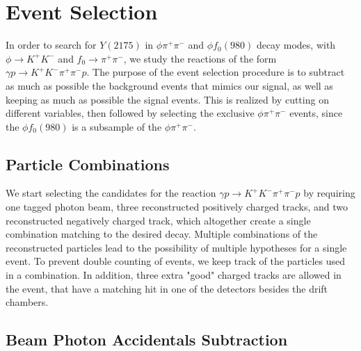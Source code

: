 \section{Event Selection}
\label{sec.evt_sel}

In order to search for $Y(2175)$ in $\phi \pi^+ \pi^-$ and $\phi f_0(980)$ decay modes, with $\phi \rightarrow K^+ K^- $ and $f_0 \rightarrow \pi^+ \pi^-$, we study the reactions of the form $\gamma p \rightarrow K^+ K^- \pi^+ \pi^- p$. The purpose of the event selection procedure is to subtract as much as possible the background events that mimics our signal, as well as keeping as much as possible the signal events. This is realized by cutting on different variables, then followed by selecting the exclusive $\phi \pi^+ \pi^-$ events, since the $\phi f_0(980)$ is a subsample of the $\phi \pi^+ \pi^-$.

\subsection{Particle Combinations}
\label{sec.evt_sel.par_com}

We start selecting the candidates for the reaction $\gamma p \rightarrow K^+ K^- \pi^+ \pi^- p$ by requiring one tagged photon beam, three reconstructed positively charged tracks, and two reconstructed negatively charged track, which altogether create a single combination matching to the desired decay. Multiple combinations of the reconstructed particles lead to the possibility of multiple hypotheses for a single event. To prevent double counting of events, we keep track of the particles used in a combination. In addition, three extra "good" charged tracks are allowed in the event, that have a matching hit in one of the detectors besides the drift chambers.

\subsection{Beam Photon Accidentals Subtraction}
\label{sec.evt_sel.bea_pho_acc_sub}

